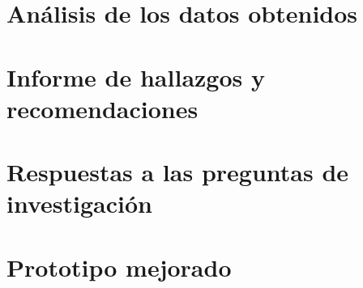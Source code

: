 








\section{Análisis de los datos obtenidos}

\section{Informe de hallazgos y recomendaciones}

\section{Respuestas a las preguntas de investigación}

\section{Prototipo mejorado}